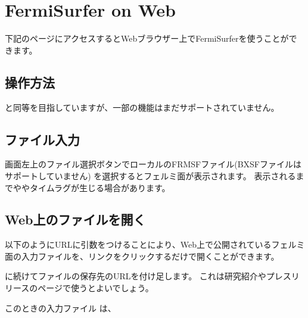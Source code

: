 \documentclass[letterpaper,10pt,dvipdfmx,openany]{sphinxmanual}
\begin{document}
\sphinxstepscope


\chapter{FermiSurfer on Web}
\label{\detokenize{onweb:fermisurfer-on-web}}\label{\detokenize{onweb::doc}}
\sphinxAtStartPar
下記のページにアクセスするとWebブラウザー上でFermiSurferを使うことができます。


\section{操作方法}
\label{\detokenize{onweb:id1}}
\sphinxAtStartPar
{\hyperref[\detokenize{ops:ops}]{}} と同等を目指していますが、一部の機能はまだサポートされていません。


\section{ファイル入力}
\label{\detokenize{onweb:id2}}
\sphinxAtStartPar
画面左上のファイル選択ボタンでローカルのFRMSFファイル(BXSFファイルはサポートしていません)
を選択するとフェルミ面が表示されます。
表示されるまでややタイムラグが生じる場合があります。


\section{Web上のファイルを開く}
\label{\detokenize{onweb:web}}
\sphinxAtStartPar
以下のようにURLに引数をつけることにより、Web上で公開されているフェルミ面の入力ファイルを、リンクをクリックするだけで開くことができます。

\sphinxAtStartPar
{}

\sphinxAtStartPar
{} に続けてファイルの保存先のURLを付け足します。
これは研究紹介やプレスリリースのページで使うとよいでしょう。

\sphinxAtStartPar
このときの入力ファイル  は、

\begin{sphinxVerbatim}[commandchars=\\\{\}]
\end{sphinxVerbatim}
\end{document}
